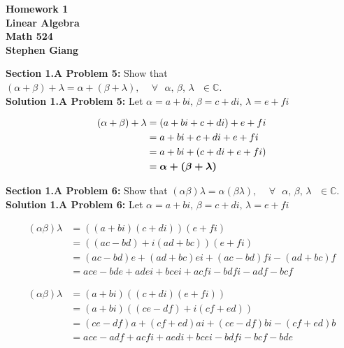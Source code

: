 \documentclass[12pt]{article}
\newcommand{\di}{i}
\begin{document}
	
	\begin{center}
		\textbf{Homework 1} \\
		\textbf{Linear Algebra} \\
		\textbf{Math 524} \\
		\textbf{Stephen Giang} \\
	\end{center}

\noindent\textbf{Section 1.A Problem 5: } Show that $(\alpha + \beta) + \lambda = \alpha + (\beta + \lambda) \text{, } \quad \forall \text{ } \alpha \text{, } \beta \text{, } \lambda \text{ } \in \mathbb{C}$. \\

\noindent \textbf{Solution 1.A Problem 5: } Let $\alpha = a + b\di \text{, } \beta = c + d\di \text{, }  \lambda = e + f\di$

	\begin{align} 
		(\alpha + \beta) + \lambda &= (a+b\di +c+d\di) + e+f\di \\
		&= a+b\di +c+d\di + e+f\di \\
		&= a+b\di +(c+d\di + e+f\di) \\
		&= \boldmath{\text{$ \alpha +(\beta + \lambda) $} } 
	\end{align}
	
\vspace{\baselineskip}
	
\noindent\textbf{Section 1.A Problem 6: } Show that $(\alpha \beta) \lambda = \alpha (\beta \lambda) \text{, } \quad  \forall \text{ } \alpha \text{, } \beta \text{, } \lambda \text{ } \in \mathbb{C}$. \\
	
\noindent \textbf{Solution 1.A Problem 6: } Let $\alpha = a + b\di \text{, } \beta = c + d\di \text{, }  \lambda = e + f\di$

	\begin{align} 
		(\alpha \beta) \lambda &= ((a+b\di)(c+d\di))(e+f\di) \\
		&= ((ac - bd) + \di(ad + bc))(e+f\di) \\
		&= (ac - bd)e + (ad + bc)e\di + (ac - bd)f\di - (ad + bc)f  \\
		&= ace - bde + ade\di + bce\di + acf\di - bdf\di - adf - bcf 
	\end{align}
	
	\begin{align} 
		(\alpha \beta) \lambda &= (a+b\di)((c+d\di)(e+f\di)) \\
		&= (a+b\di)((ce - df)+\di(cf + ed)) \\
		&= (ce - df)a +(cf + ed)a\di + (ce - df)b\di -(cf + ed)b \\
		&= ace - adf + acf\di + aed\di + bce\di - bdf\di - bcf - bde	
	\end{align}
	
\end{document}
